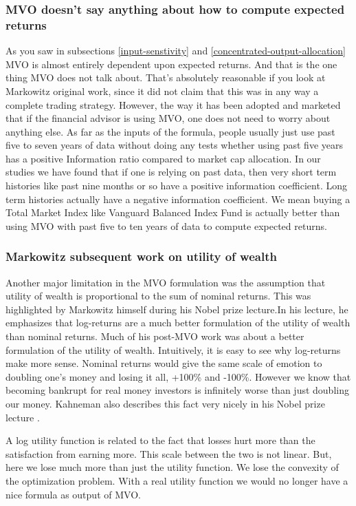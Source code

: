 \documentclass[a4paper]{article}
\begin{document}
\subsubsection{MVO doesn’t say anything about how to compute expected returns}
As you saw in subsections \ref{input-senstivity} and \ref{concentrated-output-allocation} MVO is almost entirely dependent upon expected returns. And that is the one thing MVO does not talk about. That’s absolutely reasonable if you look at Markowitz original work, since it did not claim that this was in any way a complete trading strategy. However, the way it has been adopted and marketed that if the financial advisor is using MVO, one does not need to worry about anything else. As far as the inputs of the formula, people usually just use past five to seven years of data without doing any tests whether using past five years has a positive Information ratio compared to market cap allocation. In our studies we have found that if one is relying on past data, then very short term histories like past nine months or so have a positive information coefficient. Long term histories actually have a negative information coefficient. We mean buying a Total Market Index like Vanguard Balanced Index Fund is actually better than using MVO with past five to ten years of data to compute expected returns.

\subsubsection{Markowitz subsequent work on utility of wealth}
Another major limitation in the MVO formulation was the assumption that utility of wealth is proportional to the sum of nominal returns. This was highlighted by Markowitz himself during his Nobel prize lecture\cite{hm90}.In his lecture, he emphasizes that log-returns are a much better formulation of the utility of wealth than nominal returns. Much of his post-MVO work was about a better formulation of the utility of wealth. Intuitively, it is easy to see why log-returns make more sense. Nominal returns would give the same scale of emotion to doubling one’s money and losing it all, +100\% and -100\%. However we know that becoming bankrupt for real money investors is infinitely worse than just doubling our money. Kahneman also describes this fact very nicely in his Nobel prize lecture \cite{dk2002}.

A log utility function is related to the fact that losses hurt more than the satisfaction from earning more. This scale between the two is not linear. But, here we lose much more than just the utility function. We lose the convexity of the optimization problem. With a real utility function we would no longer have a nice formula as output of MVO.
\end{document}
